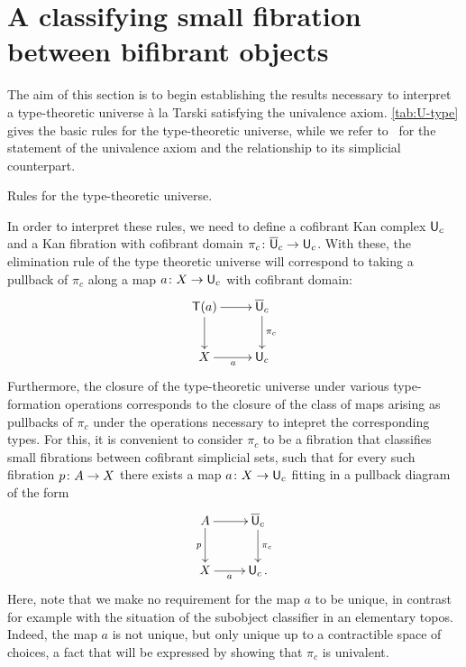 \documentclass[reqno,10pt,a4paper,oneside,draft]{amsart}
\begin{document}
 

\section{A  classifying small fibration between bifibrant objects}
\label{sec:unifbb}


The aim of this section is to begin establishing the results necessary to interpret a type-theoretic universe
\`a la Tarski satisfying the univalence axiom. \cref{tab:U-type} gives the basic rules for the type-theoretic universe,
while we refer to~\cite{voevodsky-simplicial-model} for the statement of the univalence axiom and the
relationship to its simplicial counterpart.

\begin{table}[htb]
\smallskip
\caption{Rules for the type-theoretic universe.} 
\label{tab:U-type}
\end{table}

In order to interpret these rules, we need to define a cofibrant Kan complex $\mathsf{U}_c$ and a Kan 
fibration with cofibrant domain $\pi_c \colon \overline{\mathsf{U}}_c \to \mathsf{U}_c$. With these, the elimination rule of the
type theoretic universe will correspond to taking a pullback of $\pi_c$ along a map $a \colon X
\to \mathsf{U}_c$ with cofibrant domain:
\[
\xymatrix{
\mathsf{T}(a) \ar[d] \ar[r] & \UU_c \ar[d]^{\pi_c} \\
X \ar[r]_a & \U_c}
\]
Furthermore, the closure of the type-theoretic universe under various type-formation operations
corresponds to the closure of the class of maps arising as pullbacks of $\pi_c$ under the 
operations necessary to intepret the corresponding types. For this, it is convenient to consider
$\pi_c$ to be a fibration that classifies small fibrations between cofibrant simplicial
sets, \ie such that for every such fibration $p \colon A \to X$ there exists a map $a \colon X \to \mathsf{U}_c$ fitting in a pullback diagram of the form
\[
\xymatrix{
A \ar[r] \ar[d]_p   & \UU_c \ar[d]^{\pi_c} \\
X \ar[r]_-a &  \U_c \, .}
\]
Here, note that we make no requirement for
the map $a$ to be unique, in contrast for example with the situation of the subobject classifier
in an elementary topos. Indeed, the map $a$ is not unique, but only unique  up to a contractible space
of choices, a fact that will be expressed by showing that $\pi_c$ is univalent. 
\end{document}
